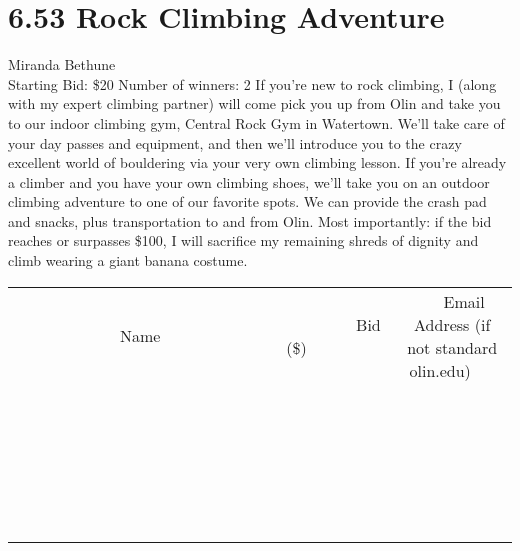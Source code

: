\documentclass[11pt]{article}
\begin{document}
\section*{6.53 Rock Climbing Adventure}
Miranda Bethune
\\
Starting Bid: \$20
\newline
Number of winners: 2
\newline
If you're new to rock climbing, I (along with my expert climbing partner) will come pick you up from Olin and take you to our indoor climbing gym, Central Rock Gym in Watertown. We'll take care of your day passes and equipment, and then we'll introduce you to the crazy excellent world of bouldering via your very own climbing lesson. If you're already a climber and you have your own climbing shoes, we'll take you on an outdoor climbing adventure to one of our favorite spots. We can provide the crash pad and snacks, plus transportation to and from Olin. Most importantly: if the bid reaches or surpasses \$100, I will sacrifice my remaining shreds of dignity and climb wearing a giant banana costume.
\\[6ex]
\begin{tabular}{c c c}
~~~~~~~~~~~~~Name~~~~~~~~~~~~~ & ~~~~~~~~~Bid (\$)~~~~~~~~~  & ~~~Email Address (if not standard olin.edu)~~~\\
 & & \\
\hline
 & & \\
\hline
 & & \\
\hline
 & & \\
\hline
 & & \\
\hline
 & & \\
\hline
 & & \\
\hline
 & & \\
\hline
 & & \\
\hline
 & & \\
\hline
 & & \\
\hline
 & & \\
\hline
 & & \\
\hline
 & & \\
\hline
 & & \\
\hline
 & & \\
\hline
 & & \\
\hline
 & & \\
\hline
 & & \\
\hline
 & & \\
\hline
 & & \\
\hline
 & & \\
\hline
 & & \\
\hline
 & & \\
\hline
 & & \\
\hline
 & & \\
\hline
\end{tabular}
\newpage
\end{document}

